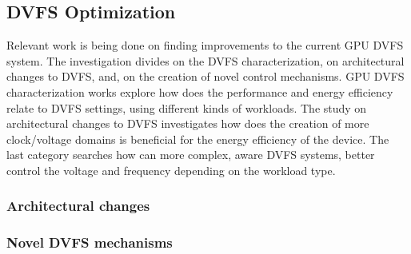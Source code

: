 \subsection{DVFS Optimization}

Relevant work is being done on finding improvements to the current GPU DVFS system. The investigation divides on the DVFS characterization, on architectural changes to DVFS, and, on the creation of novel control mechanisms. GPU DVFS characterization works explore how does the performance and energy efficiency relate to DVFS settings, using different kinds of workloads. The study on architectural changes to DVFS investigates how does the creation of more clock/voltage domains is beneficial for the energy efficiency of the device. The last category searches how can more complex, aware DVFS systems, better control the voltage and frequency depending on the workload type.



\subsubsection{Architectural changes}





\subsubsection{Novel DVFS mechanisms}





